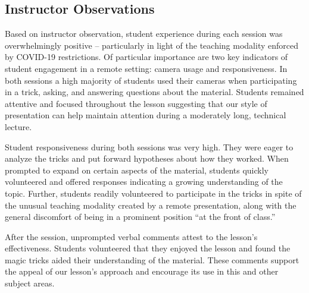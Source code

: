 \subsection{Instructor Observations}

Based on instructor observation, student experience during
each session was overwhelmingly positive --
particularly in light of the teaching modality enforced by COVID-19
restrictions.
Of particular importance are two key indicators
of student engagement in a remote setting: camera usage and
responsiveness.  In both sessions a high majority of students used their
cameras when participating in a trick, asking, and answering questions
about the material.  Students remained attentive and focused throughout
 the lesson suggesting that our
style of presentation can help maintain attention during a moderately long,
technical lecture.

Student responsiveness during both sessions was very high.
They were eager to analyze the
tricks and put forward hypotheses about how they worked.
When prompted to
expand on certain aspects of the material, students quickly volunteered and
offered responses indicating a growing understanding of the topic.
Further, students readily volunteered to participate in the tricks in spite
of the unusual teaching modality created by a remote presentation, 
along with the general discomfort of being in a
prominent position ``at the front of class.''

After the session,
unprompted verbal comments attest to the lesson's effectiveness.
Students volunteered that they enjoyed the
lesson and found the magic tricks aided their understanding of the
material.  These comments support the appeal of our lesson's approach and
encourage its use in this and other subject areas.
